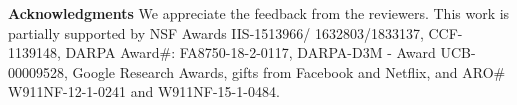 \documentclass[twoside]{article}
\begin{document}
%

%











\textbf{Acknowledgments} {\small We appreciate the feedback from the reviewers. This work is partially supported by NSF Awards IIS-1513966/ 1632803/1833137, CCF-1139148, DARPA Award\#: FA8750-18-2-0117,  DARPA-D3M - Award UCB-00009528, Google Research Awards, gifts from Facebook and Netflix, and ARO\# W911NF-12-1-0241 and W911NF-15-1-0484.}


 
\end{document}
